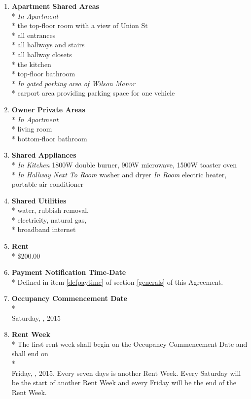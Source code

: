 \documentclass[12pt,letterpaper]{article}
\newcommand{\datefillin}{\hspace{0.2cm}\makebox[.2\linewidth]{\hrulefill}}
\newcommand{\condo}{Wilson Manor}
\newcommand{\apt}{Apartment}
\newcommand{\room}{Room}
\newcommand{\shared}{Apartment Shared Areas}
\newcommand{\livingroom}{Owner Private Areas}
\newcommand{\appliances}{Shared Appliances}
\newcommand{\utilities}{Shared Utilities}
\newcommand{\firstday}{Occupancy Commencement Date}
\newcommand{\rentweek}{Rent Week}
\newcommand{\paymenttime}{Payment Notification Time-Date}
\begin{document}
\begin{multicols}{2}
\begin{enumerate}
			\item \textbf{\shared{}}\\* \label{shared}
				\textit{In \apt{}}\\*
				the top-floor room with a view of Union St\\*
				all entrances\\*
				all hallways and stairs\\*
				all hallway closets\\*
				the kitchen\\*
				top-floor bathroom\\*
				\textit{In gated parking area of \condo{}}\\*
				carport area providing parking space for one vehicle
				
			\item \textbf{\livingroom{}}\\* \label{livingroom}
				\textit{In \apt{}}\\*
				living room\\*
				bottom-floor bathroom
				
			\item \textbf{\appliances}\\* \label{appliances}
				\textit{In Kitchen} 1800W double burner,
				900W microwave,
				1500W toaster oven\\*
				\textit{In Hallway Next To \room{}} washer and dryer
				\textit{In \room{}} electric heater,
				portable air conditioner
				
			\item \textbf{\utilities{}}\\* \label{utilities}
				water,
				rubbish removal,\\*
				electricity,
				natural gas,\\*
				broadband internet

			\item \textbf{Rent}\\* \label{rent}
				\$200.00

			\item \textbf{\paymenttime{}}\\* \label{paymenttime}
				Defined in item \ref{defpaytime} of section \ref{generals} of this Agreement.

			\item \textbf{\firstday{}} \label{firstday} \\* \\
				Saturday, \datefillin, 2015

			\item \textbf{\rentweek{}}\\* \label{rentweek}
				The first rent week shall begin on the \firstday{} and shall end on \\* \\
				Friday, \datefillin, 2015. Every seven days is another \rentweek{}. Every Saturday will be the start of another \rentweek{} and every Friday will be the end of the \rentweek{}.
				

\end{enumerate}
\end{multicols}
\end{document}
